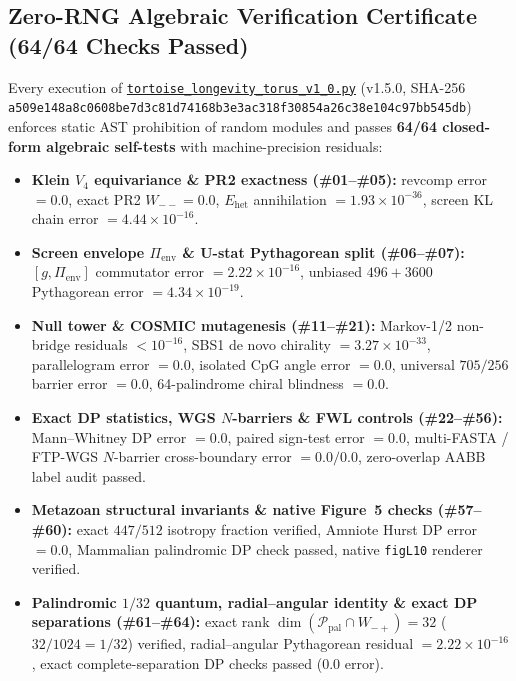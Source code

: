 \documentclass[11pt,a4paper]{article}
\renewcommand{\_}{\origunderscore\penalty200\relax}
\theoremstyle{remark}
\begin{document}
\subsection{Zero-RNG Algebraic Verification Certificate (64/64 Checks Passed)}
\label{app:selftest}
Every execution of \href{https://github.com/Dr-Logvinovich/longevity-codon-torus/blob/main/tortoise_longevity_torus_v1_0.py}{\nolinkurl{tortoise_longevity_torus_v1_0.py}} (v1.5.0, SHA-256 \texttt{a509e148\allowbreak a8c0608b\allowbreak e7d3c81d\allowbreak 74168b3e\allowbreak 3ac318f3\allowbreak 0854a26c\allowbreak 38e104c9\allowbreak 7bb545db}) enforces static AST prohibition of random modules and passes \textbf{64/64 closed-form algebraic self-tests} with machine-precision residuals:
\begin{itemize}
  \item \textbf{Klein $V_4$ equivariance \& PR2 exactness (\#01--\#05):} revcomp error $= 0.0$, exact PR2 $W_{--} = 0.0$, $E_{\mathrm{het}}$ annihilation $= 1.93 \times 10^{-36}$, screen KL chain error $= 4.44 \times 10^{-16}$.
  \item \textbf{Screen envelope $\Pi_{\mathrm{env}}$ \& U-stat Pythagorean split (\#06--\#07):} $[g, \Pi_{\mathrm{env}}]$ commutator error $= 2.22 \times 10^{-16}$, unbiased $496+3600$ Pythagorean error $= 4.34 \times 10^{-19}$.
  \item \textbf{Null tower \& COSMIC mutagenesis (\#11--\#21):} Markov-1/2 non-bridge residuals $< 10^{-16}$, SBS1 de novo chirality $= 3.27 \times 10^{-33}$, parallelogram error $= 0.0$, isolated CpG angle error $= 0.0$, universal $705/256$ barrier error $= 0.0$, 64-palindrome chiral blindness $= 0.0$.
  \item \textbf{Exact DP statistics, WGS $N$-barriers \& FWL controls (\#22--\#56):} Mann--Whitney DP error $= 0.0$, paired sign-test error $= 0.0$, multi-FASTA / FTP-WGS $N$-barrier cross-boundary error $= 0.0 / 0.0$, zero-overlap AABB label audit passed.
  \item \textbf{Metazoan structural invariants \& native Figure~5 checks (\#57--\#60):} exact $447/512$ isotropy fraction verified, Amniote Hurst DP error $= 0.0$, Mammalian palindromic DP check passed, native \texttt{fig\_L10} renderer verified.
  \item \textbf{Palindromic $1/32$ quantum, radial--angular identity \& exact DP separations (\#61--\#64):} exact rank $\dim(\mathcal{P}_{\mathrm{pal}}\cap W_{-+}) = 32$ ($32/1024 = 1/32$) verified, radial--angular Pythagorean residual $= 2.22 \times 10^{-16}$, exact complete-separation DP checks passed ($0.0$ error).
\end{itemize}
\end{document}
